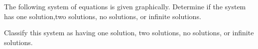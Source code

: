 \documentclass{ximera}
\author{Elizabeth Miller, Kenneth Berglund}
\begin{document}
The following system of equations is given graphically.  Determine if the system has one solution,two solutions, no solutions, or infinite solutions.

\begin{image}
\end{image}

\begin{exercise}
Classify this system as having one solution, two solutions, no solutions, or infinite solutions.
\begin{multipleChoice}  
\end{multipleChoice}  




\end{exercise}
\end{document}
